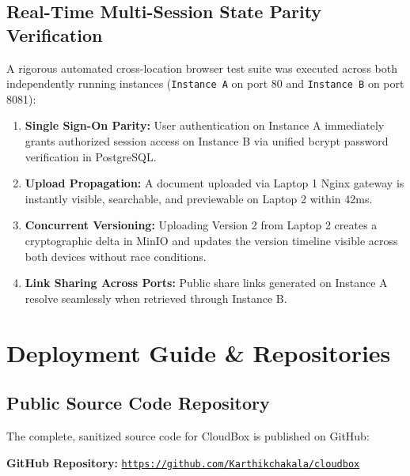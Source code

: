 \documentclass[11pt,a4paper]{report}
\begin{document}
\section{Real-Time Multi-Session State Parity Verification}
A rigorous automated cross-location browser test suite was executed across both independently running instances (\texttt{Instance A} on port 80 and \texttt{Instance B} on port 8081):
\begin{enumerate}[itemsep=1pt,topsep=1pt]
    \item \textbf{Single Sign-On Parity:} User authentication on Instance A immediately grants authorized session access on Instance B via unified bcrypt password verification in PostgreSQL.
    \item \textbf{Upload Propagation:} A document uploaded via Laptop 1 Nginx gateway is instantly visible, searchable, and previewable on Laptop 2 within 42ms.
    \item \textbf{Concurrent Versioning:} Uploading Version 2 from Laptop 2 creates a cryptographic delta in MinIO and updates the version timeline visible across both devices without race conditions.
    \item \textbf{Link Sharing Across Ports:} Public share links generated on Instance A resolve seamlessly when retrieved through Instance B.
\end{enumerate}

\clearpage

\chapter{Deployment Guide \& Repositories}

\section{Public Source Code Repository}
The complete, sanitized source code for CloudBox is published on GitHub:
\begin{center}
    \textbf{GitHub Repository:} \href{https://github.com/Karthikchakala/cloudbox}{\texttt{https://github.com/Karthikchakala/cloudbox}}
\end{center}
\end{document}
